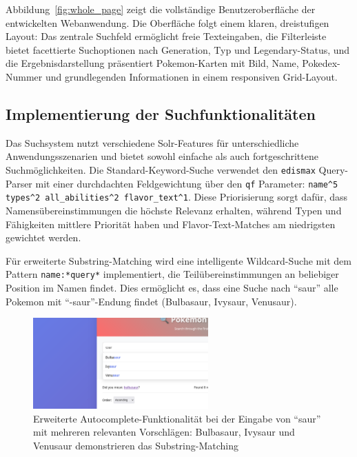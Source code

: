 Abbildung~\ref{fig:whole_page} zeigt die vollständige Benutzeroberfläche der entwickelten Webanwendung. Die Oberfläche folgt einem klaren, dreistufigen Layout: Das zentrale Suchfeld ermöglicht freie Texteingaben, die Filterleiste bietet facettierte Suchoptionen nach Generation, Typ und Legendary-Status, und die Ergebnisdarstellung präsentiert Pokemon-Karten mit Bild, Name, Pokedex-Nummer und grundlegenden Informationen in einem responsiven Grid-Layout.

\subsection{Implementierung der Suchfunktionalitäten}

Das Suchsystem nutzt verschiedene Solr-Features für unterschiedliche Anwendungsszenarien und bietet sowohl einfache als auch fortgeschrittene Suchmöglichkeiten. Die Standard-Keyword-Suche verwendet den \texttt{edismax} Query-Parser mit einer durchdachten Feldgewichtung über den \texttt{qf} Parameter: \texttt{name\textasciicircum 5 types\textasciicircum 2 all\_abilities\textasciicircum 2 flavor\_text\textasciicircum 1}. Diese Priorisierung sorgt dafür, dass Namensübereinstimmungen die höchste Relevanz erhalten, während Typen und Fähigkeiten mittlere Priorität haben und Flavor-Text-Matches am niedrigsten gewichtet werden.

Für erweiterte Substring-Matching wird eine intelligente Wildcard-Suche mit dem Pattern \texttt{name:*query*} implementiert, die Teilübereinstimmungen an beliebiger Position im Namen findet. Dies ermöglicht es, dass eine Suche nach "`saur"' alle Pokemon mit "`-saur"'-Endung findet (Bulbasaur, Ivysaur, Venusaur).

\begin{figure}[htbp]
    \centering
    \includegraphics[width=0.6\textwidth]{figures/Screenshot_multiple_suggestions.png}
    \caption{Erweiterte Autocomplete-Funktionalität bei der Eingabe von "`saur"' mit mehreren relevanten Vorschlägen: Bulbasaur, Ivysaur und Venusaur demonstrieren das Substring-Matching}
    \label{fig:multiple_suggestions}
\end{figure}

